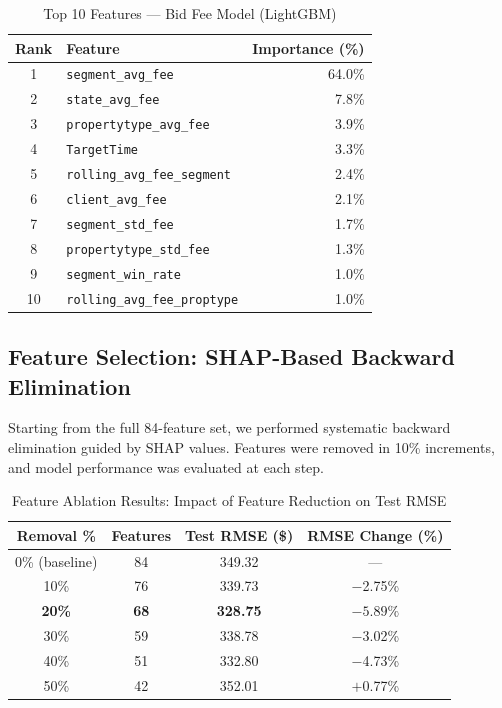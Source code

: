 \documentclass[12pt,a4paper]{article}
\begin{document}
\begin{table}[H]
\centering
\caption{Top 10 Features --- Bid Fee Model (LightGBM)}
\label{tab:top-features-bidfee}
\begin{tabular}{clr}
\toprule
\textbf{Rank} & \textbf{Feature} & \textbf{Importance (\%)} \\
\midrule
1 & \texttt{segment\_avg\_fee} & 64.0\% \\
2 & \texttt{state\_avg\_fee} & 7.8\% \\
3 & \texttt{propertytype\_avg\_fee} & 3.9\% \\
4 & \texttt{TargetTime} & 3.3\% \\
5 & \texttt{rolling\_avg\_fee\_segment} & 2.4\% \\
6 & \texttt{client\_avg\_fee} & 2.1\% \\
7 & \texttt{segment\_std\_fee} & 1.7\% \\
8 & \texttt{propertytype\_std\_fee} & 1.3\% \\
9 & \texttt{segment\_win\_rate} & 1.0\% \\
10 & \texttt{rolling\_avg\_fee\_proptype} & 1.0\% \\
\bottomrule
\end{tabular}
\end{table}

\subsection{Feature Selection: SHAP-Based Backward Elimination}
\label{sec:feature-selection}

Starting from the full 84-feature set, we performed systematic backward elimination guided by SHAP values. Features were removed in 10\% increments, and model performance was evaluated at each step.

\begin{table}[H]
\centering
\caption{Feature Ablation Results: Impact of Feature Reduction on Test RMSE}
\label{tab:feature-ablation}
\begin{tabular}{cccc}
\toprule
\textbf{Removal \%} & \textbf{Features} & \textbf{Test RMSE (\$)} & \textbf{RMSE Change (\%)} \\
\midrule
0\% (baseline) & 84 & 349.32 & --- \\
10\% & 76 & 339.73 & $-$2.75\% \\
\textbf{20\%} & \textbf{68} & \textbf{328.75} & $\mathbf{-5.89\%}$ \\
30\% & 59 & 338.78 & $-$3.02\% \\
40\% & 51 & 332.80 & $-$4.73\% \\
50\% & 42 & 352.01 & $+$0.77\% \\
\bottomrule
\end{tabular}
\end{table}
\end{document}
